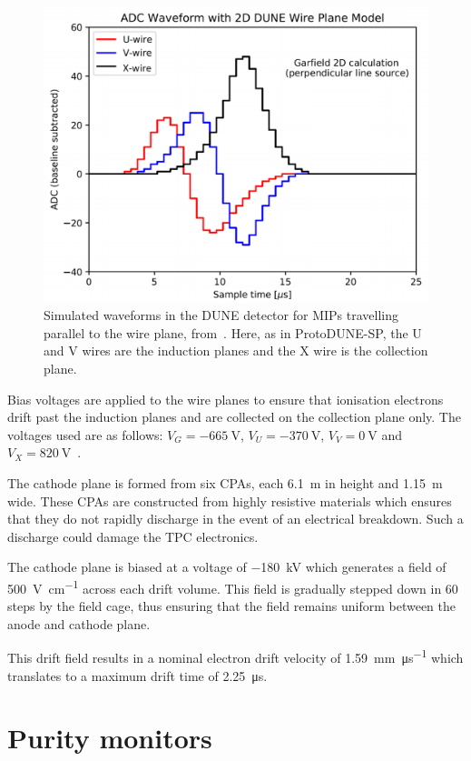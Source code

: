 \begin{figure}[h]
	\centering
	\includegraphics[width=.6\linewidth]{files/figures/protodune_detector/wireSignals}
	\caption[Simulated waveforms in the DUNE detector for MIPs travelling parallel to the wire plane]{Simulated waveforms in the DUNE detector for MIPs travelling parallel to the wire plane, from~\cite{tdrVol2}. Here, as in ProtoDUNE-SP, the U and V wires are the induction planes and the X wire is the collection plane.}
	\label{fig:wireSignals}
\end{figure}

Bias voltages are applied to the wire planes to ensure that ionisation electrons drift past the induction planes and are collected on the collection plane only.
The voltages used are as follows: $V_{G} = \SI{-665}{\volt}$, $V_{U} = \SI{-370}{\volt}$, $V_{V} = \SI{0}{\volt}$ and $V_{X} = \SI{+820}{\volt}$~\cite{protodunePerformance}.

The cathode plane is formed from six CPAs, each \SI{6.1}{\m} in height and \SI{1.15}{\m} wide.
These CPAs are constructed from highly resistive materials which ensures that they do not rapidly discharge in the event of an electrical breakdown.
Such a discharge could damage the TPC electronics.

The cathode plane is biased at a voltage of \SI{-180}{\kilo\volt} which generates a field of \SI{500}{\volt\per\cm} across each drift volume.
This field is gradually stepped down in 60 steps by the field cage, thus ensuring that the field remains uniform between the anode and cathode plane.

This drift field results in a nominal electron drift velocity of \SI{1.59}{\mm\per\micro\second} which translates to a maximum drift time of \SI{2.25}{\micro\second}.

\section{Purity monitors}
\label{sec:protodune:prms}

